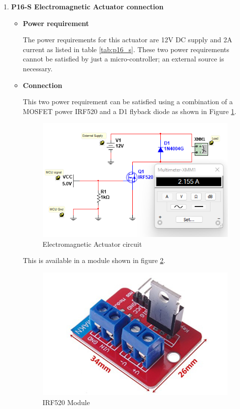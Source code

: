 \begin{enumerate}
    \item \textbf{P16-S Electromagnetic Actuator connection}
    \par
    \begin{itemize}
        \item \textbf{Power requirement}
        \par
        The power requirements for this actuator are 12V DC supply and 2A current as listed in table \ref{tab:p16_s}. These two power requirements cannot be satisfied by just a micro-controller; an external source is necessary.
        \item \textbf{Connection}
        \par
        This two power requirement can be satisfied using a combination of a MOSFET power IRF520 and a D1 flyback diode as shown in Figure \ref{fig:electromagnet_connection}.
        \begin{figure}[H]
            \centering
            \includegraphics{Figures/ElectromagnetConnection.png}
            \caption{Electromagnetic Actuator circuit}
            \label{fig:electromagnet_connection}
        \end{figure}
        This is available in a module shown in figure \ref{fig:irf520_module}.
        \begin{figure}[H]
            \centering
            \includegraphics[width=.25\textwidth,height=.25\textheight]{Figures/IRF520Module.jpg}
            \caption[IRF520 Module]{IRF520 Module \cite{irf520}}
            \label{fig:irf520_module}
        \end{figure}
    \end{itemize}
\end{enumerate}
